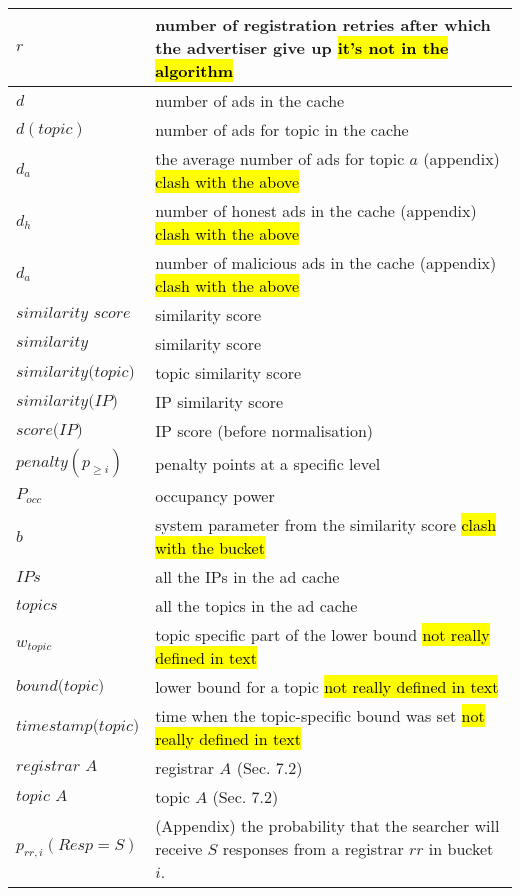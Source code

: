\begin{table*}
\begin{center}
\begin{tabular}{ | l | p{16cm} |}
        $r$ & number of registration retries after which the advertiser give up \hl{it's not in the algorithm} \\ \hline
        $d$ & number of ads in the cache \\ \hline
        $d(\textit{topic})$ & number of ads for topic in the cache \\ \hline
        $d_a$ & the average number of ads for topic $a$ (appendix) \hl{clash with the above} \\ \hline
        $d_h$ & number of honest ads in the cache (appendix) \hl{clash with the above} \\ \hline
        $d_a$ & number of malicious ads in the cache (appendix) \hl{clash with the above} \\ \hline
        $\textit{similarity score}$ & similarity score \\ \hline
        $\textit{similarity}$ & similarity score \\ \hline
        $\textit{similarity(topic)}$ & topic similarity score \\ \hline
        $\textit{similarity(IP)}$ & IP similarity score \\ \hline
        $\textit{score(IP)}$ & IP score (before normalisation) \\ \hline
        $\textit{penalty}(p_{\geq i})$ & penalty points at a specific level \\ \hline
        $P_\textit{occ}$ & occupancy power \\ \hline
        $b$ & system parameter from the similarity score \hl{clash with the bucket} \\ \hline
        $\textit{IPs}$ & all the IPs in the ad cache \\ \hline
        $\textit{topics}$ & all the topics in the ad cache \\ \hline
        $w_\textit{topic}$ & topic specific part of the lower bound \hl{not really defined in text}\\ \hline
        $\textit{bound(topic)}$ & lower bound for a topic \hl{not really defined in text}\\ \hline
        $\textit{timestamp(topic)}$ & time when the topic-specific bound was set \hl{not really defined in text}\\ \hline
        $\textit{registrar A}$ & registrar $A$ (Sec. 7.2)\\ \hline
        $\textit{topic A}$& topic $A$ (Sec. 7.2)\\ \hline
        $p_{rr,i}(Resp=S)$ & (Appendix) the probability that the searcher will receive $S$ responses from a registrar $rr$ in bucket $i$. \\ \hline

\end{tabular}
\end{center}
\end{table*}
